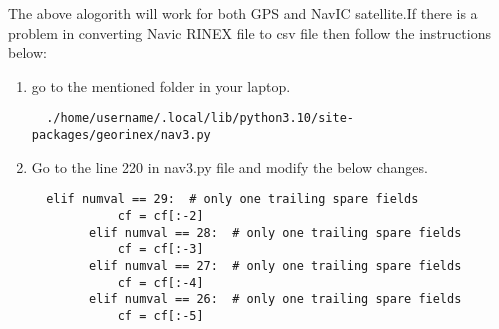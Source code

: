 \vspace{5mm}
The above alogorith will work for both GPS and NavIC satellite.If there is a problem in converting Navic RINEX file to csv file then follow the instructions below:
\begin{enumerate}
\item go to the mentioned folder in your laptop.
\begin{lstlisting}
  ./home/username/.local/lib/python3.10/site-packages/georinex/nav3.py
\end{lstlisting}
\item Go to the line 220 in nav3.py file and modify the below changes.
\begin{lstlisting}
  elif numval == 29:  # only one trailing spare fields
            cf = cf[:-2]
        elif numval == 28:  # only one trailing spare fields
            cf = cf[:-3]
        elif numval == 27:  # only one trailing spare fields
            cf = cf[:-4]
        elif numval == 26:  # only one trailing spare fields
            cf = cf[:-5]
\end{lstlisting}
\end{enumerate}
